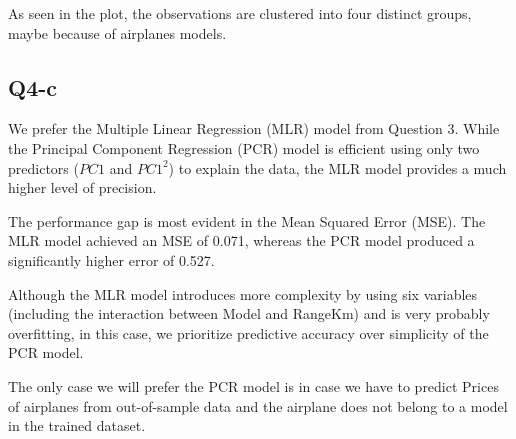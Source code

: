 As seen in the plot, the observations are clustered into four distinct groups, maybe because of airplanes models.

\subsection{Q4-c}

We prefer the Multiple Linear Regression (MLR) model from Question 3. While the Principal Component Regression (PCR) model is efficient using only two predictors ($PC1$ and $PC1^2$) to explain the data, the MLR model provides a much higher level of precision.

The performance gap is most evident in the Mean Squared Error (MSE). The MLR model achieved an MSE of 0.071, whereas the PCR model produced a significantly higher error of 0.527. 

Although the MLR model introduces more complexity by using six variables (including the interaction between Model and RangeKm) and is very probably overfitting, in this case, we prioritize predictive accuracy over simplicity of the PCR model.

The only case we will prefer the PCR model is in case we have to predict Prices of airplanes from out-of-sample data and the airplane does not belong to a model in the trained dataset.